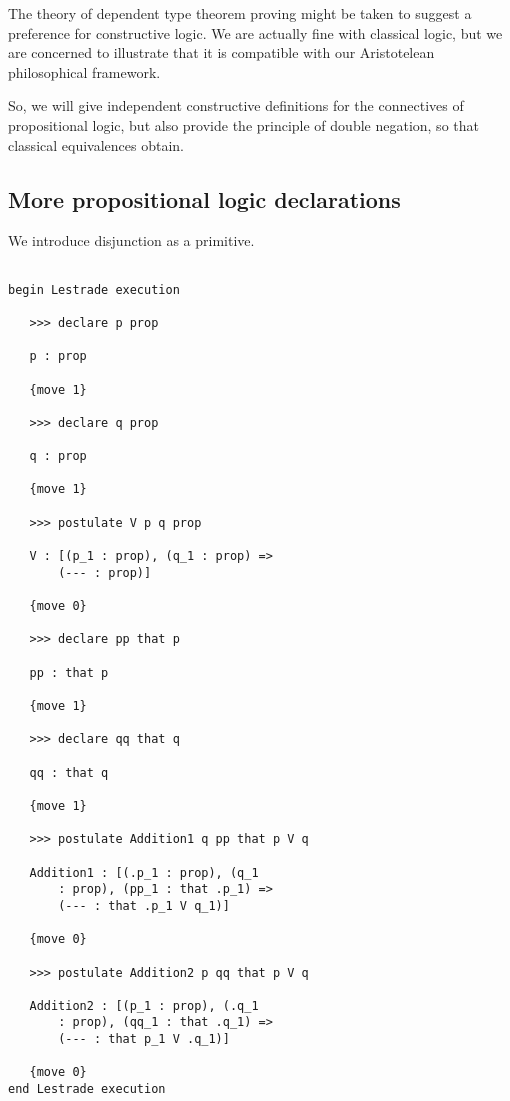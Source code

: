 \documentclass[12pt]{article}
\begin{document}
The theory of dependent type theorem proving might be taken to suggest a preference for constructive logic.  We are actually fine with classical logic, but we are concerned to illustrate that it is compatible with our Aristotelean philosophical framework.

So, we will give independent constructive definitions for the connectives of propositional logic, but also provide the principle of double negation, so that classical equivalences obtain.

\subsection{More propositional logic declarations}

We introduce disjunction as a primitive.

\begin{verbatim}

begin Lestrade execution

   >>> declare p prop

   p : prop

   {move 1}

   >>> declare q prop

   q : prop

   {move 1}

   >>> postulate V p q prop

   V : [(p_1 : prop), (q_1 : prop) => 
       (--- : prop)]

   {move 0}

   >>> declare pp that p

   pp : that p

   {move 1}

   >>> declare qq that q

   qq : that q

   {move 1}

   >>> postulate Addition1 q pp that p V q

   Addition1 : [(.p_1 : prop), (q_1 
       : prop), (pp_1 : that .p_1) => 
       (--- : that .p_1 V q_1)]

   {move 0}

   >>> postulate Addition2 p qq that p V q

   Addition2 : [(p_1 : prop), (.q_1 
       : prop), (qq_1 : that .q_1) => 
       (--- : that p_1 V .q_1)]

   {move 0}
end Lestrade execution

\end{verbatim}
\end{document}
